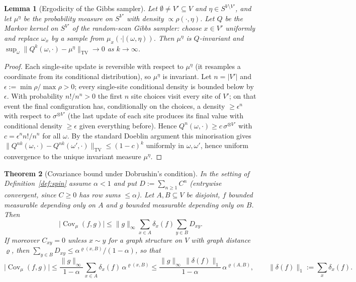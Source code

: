 \documentclass[11pt,a4paper]{article}
\newtheorem{theorem}{Theorem}[section]
\newtheorem{lemma}[theorem]{Lemma}
\theoremstyle{definition}
\theoremstyle{remark}
\DeclareMathOperator{\Cov}{Cov}
\newcommand{\norm}[1]{\lVert #1\rVert}
\newcommand{\TV}{\mathrm{TV}}
\begin{document}
\begin{lemma}[Ergodicity of the Gibbs sampler]\label{lem:ergodic}
Let $\emptyset\ne V'\subseteq V$ and $\eta\in S^{V\setminus V'}$, and let $\mu^\eta$ be the probability measure on $S^{V'}$ with
density $\propto\rho(\cdot,\eta)$. Let $Q$ be the Markov kernel on $S^{V'}$ of the random-scan Gibbs sampler: choose $x\in V'$
uniformly and replace $\omega_x$ by a sample from $\mu_x(\cdot|(\omega,\eta))$. Then $\mu^\eta$ is $Q$-invariant and
$\sup_\omega\norm{Q^k(\omega,\cdot)-\mu^\eta}_\TV\to0$ as $k\to\infty$.
\end{lemma}

\begin{proof}
Each single-site update is reversible with respect to $\mu^\eta$ (it resamples a coordinate from its conditional
distribution), so $\mu^\eta$ is invariant. Let $n=|V'|$ and $\epsilon:=\min\rho/\max\rho>0$; every single-site conditional
density is bounded below by $\epsilon$. With probability $n!/n^n>0$ the first $n$ site choices visit every site of $V'$;
on that event the final configuration has, conditionally on the choices, a density $\ge\epsilon^n$ with respect to
$\sigma^{\otimes V'}$ (the last update of each site produces its final value with conditional density $\ge\epsilon$ given
everything before). Hence $Q^n(\omega,\cdot)\ge c\,\sigma^{\otimes V'}$ with $c=\epsilon^nn!/n^n$ for all $\omega$. By the
standard Doeblin argument this minorisation gives $\norm{Q^{nk}(\omega,\cdot)-Q^{nk}(\omega',\cdot)}_\TV\le(1-c)^k$ uniformly in
$\omega,\omega'$, hence uniform convergence to the unique invariant measure $\mu^\eta$.
\end{proof}

\begin{theorem}[Covariance bound under Dobrushin's condition]\label{thm:dobrushin}
In the setting of Definition~\ref{def:spin} assume $\alpha<1$ and put $D:=\sum_{n\ge1}C^n$ (entrywise convergent, since
$C\ge0$ has row sums $\le\alpha$). Let $A,B\subseteq V$ be disjoint, $f$ bounded measurable depending only on $A$ and $g$
bounded measurable depending only on $B$. Then
\[
\bigl|\Cov_\mu(f,g)\bigr|\le\norm g_\infty\sum_{x\in A}\delta_x(f)\sum_{y\in B}D_{xy} .
\]
If moreover $C_{xy}=0$ unless $x\sim y$ for a graph structure on $V$ with graph distance $\varrho$, then
$\sum_{y\in B}D_{xy}\le\alpha^{\varrho(x,B)}/(1-\alpha)$, so that
\[
\bigl|\Cov_\mu(f,g)\bigr|\le\frac{\norm g_\infty}{1-\alpha}\sum_{x\in A}\delta_x(f)\,\alpha^{\varrho(x,B)}
\le\frac{\norm g_\infty\,\norm{\delta(f)}_1}{1-\alpha}\,\alpha^{\varrho(A,B)},\qquad \norm{\delta(f)}_1:=\sum_x\delta_x(f).
\]
\end{theorem}
\end{document}
